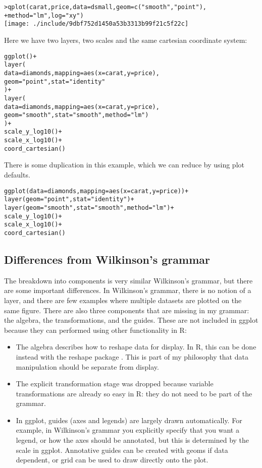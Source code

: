 \begin{alltt}
> qplot(carat, price, data = dsmall, geom = c("smooth", "point"), 
+     method = "lm", log = "xy")
\texttt{[image: ./include/9dbf752d1450a53b3313b99f21c5f22c]}

\end{alltt}

Here we have two layers, two scales and the same cartesian coordinate system:

\begin{alltt}
ggplot() + 
layer(
  data = diamonds, mapping = aes(x = carat, y = price),
  geom = "point", stat = "identity"
) + 
layer(
  data = diamonds, mapping = aes(x = carat, y = price),
  geom = "smooth", stat = "smooth", method = "lm")
) + 
scale_y_log10() + 
scale_x_log10() + 
coord_cartesian()
\end{alltt}

There is some duplication in this example, which we can reduce by using plot defaults.

\begin{alltt}
ggplot(data = diamonds, mapping = aes(x = carat, y = price)) + 
layer(geom = "point", stat = "identity") + 
layer(geom = "smooth", stat = "smooth", method = "lm") + 
scale_y_log10() + 
scale_x_log10() + 
coord_cartesian()
\end{alltt}

\subsection{Differences from Wilkinson's grammar}

The breakdown into components is very similar Wilkinson's grammar, but there are some important differences.  In Wilkinson's grammar, there is no notion of a layer, and there are few examples where multiple datasets are plotted on the same figure.  There are also three components that are missing in my grammar: the algebra, the transformations, and the guides.  These are not included in ggplot because they can performed using other functionality in R:

\begin{itemize}
	\item The algebra describes how to reshape data for display.  In R, this can be done instead with the reshape package \citep{reshape}.  This is part of my philosophy that data manipulation should be separate from display.

	\item The explicit transformation stage was dropped because variable transformations are already so easy in R: they do not need to be part of the grammar.
	
	\item In ggplot, guides (axes and legends) are largely drawn automatically.  For example, in Wilkinson's grammar you explicitly specify that you want a legend, or how the axes should be annotated, but this is determined by the scale in ggplot.  Annotative guides can be created with geoms if data dependent, or grid can be used to draw directly onto the plot.
\end{itemize}

